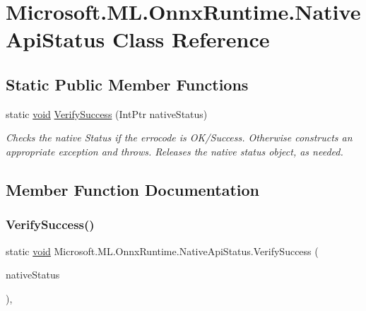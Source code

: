 \hypertarget{classMicrosoft_1_1ML_1_1OnnxRuntime_1_1NativeApiStatus}{}\section{Microsoft.\+M\+L.\+Onnx\+Runtime.\+Native\+Api\+Status Class Reference}
\label{classMicrosoft_1_1ML_1_1OnnxRuntime_1_1NativeApiStatus}
\subsection*{Static Public Member Functions}
\begin{DoxyCompactItemize}
\item 
static \mbox{\hyperlink{mlasi_8h_a88f941d423cb2a819b70a1358982b1a6}{void}} \mbox{\hyperlink{classMicrosoft_1_1ML_1_1OnnxRuntime_1_1NativeApiStatus_a1580510459f2d13ca056631528e28159}{Verify\+Success}} (Int\+Ptr native\+Status)
\begin{DoxyCompactList}\small\item\em Checks the native Status if the errocode is O\+K/\+Success. Otherwise constructs an appropriate exception and throws. Releases the native status object, as needed. \end{DoxyCompactList}\end{DoxyCompactItemize}


\subsection{Member Function Documentation}
\mbox{\label{classMicrosoft_1_1ML_1_1OnnxRuntime_1_1NativeApiStatus_a1580510459f2d13ca056631528e28159}} 
\subsubsection{\texorpdfstring{Verify\+Success()}{VerifySuccess()}}
{\footnotesize\ttfamily static \mbox{\hyperlink{mlasi_8h_a88f941d423cb2a819b70a1358982b1a6}{void}} Microsoft.\+M\+L.\+Onnx\+Runtime.\+Native\+Api\+Status.\+Verify\+Success (\begin{DoxyParamCaption}\item[{Int\+Ptr}]{native\+Status }\end{DoxyParamCaption})\hspace{0.3cm}{\ttfamily [inline]}, {\ttfamily [static]}}



